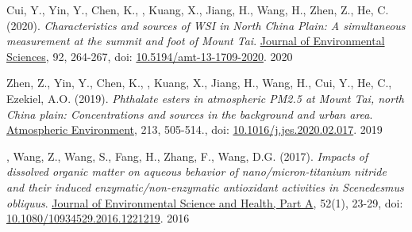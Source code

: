 \begin{cvpublications}
\publication
{Cui, Y., Yin, Y., Chen, K., , Kuang, X., Jiang, H., Wang, H., Zhen, Z., He, C. (2020).
\emph{Characteristics and sources of WSI in North China Plain: A simultaneous measurement at the summit and foot of Mount Tai}.
\underline{Journal of Environmental Sciences}, 92, 264-267,
doi: \href{https://doi.org/10.1016/j.jes.2020.02.017}{10.5194/amt-13-1709-2020}.} %
{2020} %


\publication
{Zhen, Z., Yin, Y., Chen, K., ,
Kuang, X., Jiang, H., Wang, H., Cui, Y., He, C., Ezekiel, A.O. (2019).
\emph{Phthalate esters in atmospheric PM2.5 at Mount Tai, north China plain:
Concentrations and sources in the background and urban area}.
\underline{Atmospheric Environment},
213, 505-514.,
doi: \href{https://doi.org/10.1016/j.atmosenv.2019.06.039}{10.1016/j.jes.2020.02.017}.} %
{2019} %

\publication
{, Wang, Z., Wang, S., Fang, H., Zhang, F., Wang, D.G. (2017).
\emph{Impacts of dissolved organic matter on aqueous behavior of nano/micron-titanium nitride and their induced enzymatic/non-enzymatic antioxidant activities in Scenedesmus obliquus}.
\underline{Journal of Environmental Science and Health, Part A},
52(1), 23-29,
doi: \href{https://doi.org/10.1080/10934529.2016.1221219}{10.1080/10934529.2016.1221219}.} %
{2016} %

\end{cvpublications}
